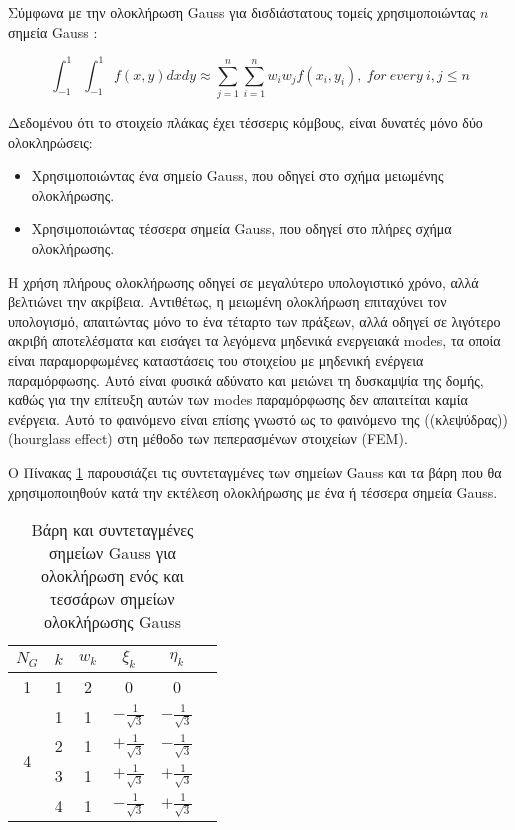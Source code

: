Σύμφωνα με την ολοκλήρωση \textlatin{Gauss} για δισδιάστατους τομείς χρησιμοποιώντας $n$ σημεία \textlatin{Gauss} :

\begin{equation}  
\int_{- 1}^{1}{\int_{- 1}^{1}{f(x,y)dxdy}} \approx \sum_{j = 1}^{n}{\sum_{i = 1}^{n}{w_{i}w_{j}f\left( x_{i},y_{i} \right),\ for\ every\ i,j \leq n}}
\end{equation}

Δεδομένου ότι το στοιχείο πλάκας έχει τέσσερις κόμβους, είναι δυνατές μόνο δύο ολοκληρώσεις:

\begin{itemize} 
  \item Χρησιμοποιώντας ένα σημείο \textlatin{Gauss}, που οδηγεί στο σχήμα μειωμένης ολοκλήρωσης. 
  \item Χρησιμοποιώντας τέσσερα σημεία \textlatin{Gauss}, που οδηγεί στο πλήρες σχήμα ολοκλήρωσης. 
\end{itemize}


Η χρήση πλήρους ολοκλήρωσης οδηγεί σε μεγαλύτερο υπολογιστικό χρόνο, αλλά βελτιώνει την ακρίβεια. Αντιθέτως, η μειωμένη ολοκλήρωση επιταχύνει τον υπολογισμό, απαιτώντας μόνο το ένα τέταρτο των πράξεων, αλλά οδηγεί σε λιγότερο ακριβή αποτελέσματα και εισάγει τα λεγόμενα μηδενικά ενεργειακά \textlatin{modes}, τα οποία είναι παραμορφωμένες καταστάσεις του στοιχείου με μηδενική ενέργεια παραμόρφωσης. Αυτό είναι φυσικά αδύνατο και μειώνει τη δυσκαμψία της δομής, καθώς για την επίτευξη αυτών των \textlatin{modes} παραμόρφωσης δεν απαιτείται καμία ενέργεια. Αυτό το φαινόμενο είναι επίσης γνωστό ως το φαινόμενο της ((κλεψύδρας)) \textlatin{(hourglass effect)} στη μέθοδο των πεπερασμένων στοιχείων \textlatin{(FEM)}.

Ο Πίνακας \ref{tab:GaussPoints} παρουσιάζει τις συντεταγμένες των σημείων \textlatin{Gauss} και τα βάρη που θα χρησιμοποιηθούν κατά την εκτέλεση ολοκλήρωσης με ένα ή τέσσερα σημεία \textlatin{Gauss}.

\setlength{\tabcolsep}{20pt}
\renewcommand{\arraystretch}{1.3}
\begin{table}[h]
    \centering
    \begin{tabular}{c | c c c c c}
        $N_G$ & $k$ & $w_k$ & $\xi_k$ & $\eta_k$ \\ \hline
        1 & 1 & 2 & 0 & 0 \\ \hline
        \multirow{4}{*}{4} & 1 & 1 & $-\frac{1}{\sqrt{3}}$ & $-\frac{1}{\sqrt{3}}$ \\
          & 2 & 1 & $+\frac{1}{\sqrt{3}}$ & $-\frac{1}{\sqrt{3}}$ \\
          & 3 & 1 & $+\frac{1}{\sqrt{3}}$ & $+\frac{1}{\sqrt{3}}$ \\
          & 4 & 1 & $-\frac{1}{\sqrt{3}}$ & $+\frac{1}{\sqrt{3}}$ \\
    \end{tabular}
    \caption{Βάρη και συντεταγμένες σημείων \textlatin{Gauss} για ολοκλήρωση ενός και τεσσάρων σημείων ολοκλήρωσης \textlatin{Gauss}}
    \label{tab:GaussPoints}
\end{table}

